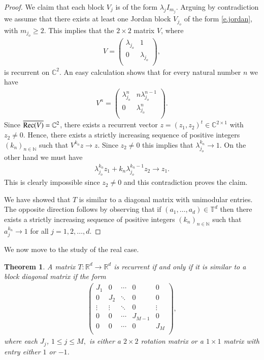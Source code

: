 \documentclass[12pt,leqno]{amsart}
\theoremstyle{plain}
\newtheorem{theorem}[equation]{Theorem}
\theoremstyle{definition}
\numberwithin{equation}{section}
\begin{document}
\begin{proof}
	We claim that each block $V_j$ is of the form $\lambda_j I_{m_j}$. Arguing by contradiction we assume that there exists at least one Jordan block $V_{j_o}$ of the form \eqref{e.jordan}, with $m_{j_o}\geq 2$. This implies that the $2\times 2$ matrix $V$, where 
	\begin{align*}
		V= 
		\begin{pmatrix}
			\lambda_{j_o} &1 \\
			0 & \lambda_{j_o}\\
		\end{pmatrix}
		, 
	\end{align*}
	is recurrent on $\mathbb C^2$. An easy calculation shows that for every natural number $n$ we have 
	\begin{align*}
		V^n = 
		\begin{pmatrix}
			\lambda_{j_o} ^n & n\lambda_{j_o}^{n-1} \\
			0 & \lambda_{j_o} ^n\\
		\end{pmatrix}
		. 
	\end{align*}
	Since $\overline{{\textnormal{Rec}}(V)}={\mathbb C}^2$, there exists a recurrent vector $z=(z_1,z_2)^t \in{\mathbb C}^{2\times 1}$ with $z_2\neq 0$. Hence, there exists a strictly increasing sequence of positive integers $(k_n)_{n\in\mathbb N}$ such that $V^{k_n}z\to z$. Since $z_2\neq 0$ this implies that $\lambda_{j_o} ^{k_n}\to 1$. On the other hand we must have 
	\begin{align*}
		\lambda_{j_o} ^{k_n} z_1+k_n\lambda_{j_o} ^{k_n-1}z_2\to z_1. 
	\end{align*}
	This is clearly impossible since $z_2\neq 0$ and this contradiction proves the claim.
	
	We have showed that $T$ is similar to a diagonal matrix with unimodular entries. The opposite direction follows by observing that if $(a_1,\ldots,a_d)\in \mathbb T^d$ then there exists a strictly increasing sequence of positive integers $(k_n)_{n\in\mathbb N}$ such that $a_j ^{k_n}\to 1 $ for all $j=1,2,\ldots,d$. 
\end{proof}

We now move to the study of the real case.

\begin{theorem}
	A matrix $T:{\mathbb R}^d\to {\mathbb R}^d$ is recurrent if and only if it is similar to a block diagonal matrix if the form
	\begin{align*}
		\begin{pmatrix}
			J_1 &0 & \cdots&0 &0 \\
			0 & J_2 & \ddots &0 & 0 \\
			\vdots & \vdots & \ddots & 0 &\vdots \\
			0 & 0 & \cdots &J_{M-1} & 0 \\
			0 & 0 & \cdots & 0 & J_M\\
		\end{pmatrix}
		, 
	\end{align*}
	where each $J_j$, $1\leq j \leq M,$ is either a $2\times 2$ rotation matrix or a $1\times 1$ matrix with entry either $1$ or $-1$. 
\end{theorem}
\end{document}
